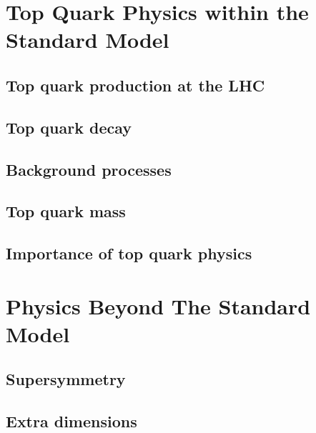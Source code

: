 \newpage
\section{Top Quark Physics within the Standard Model}
\label{s:top_quak_physics}

\subsection{Top quark production at the LHC}
\label{ss:top_production}

\subsection{Top quark decay}
\label{ss:top_decay}

\subsection{Background processes}
\label{ss:backgrounds}

\subsection{Top quark mass}
\label{ss:top_mass}

\subsection{Importance of top quark physics}
\label{ss:importance}

\section{Physics Beyond The Standard Model}
\label{s:BSM}

\subsection{Supersymmetry}
\label{ss:SUSY}

\subsection{Extra dimensions}
\label{ss:extra_dimensions}


